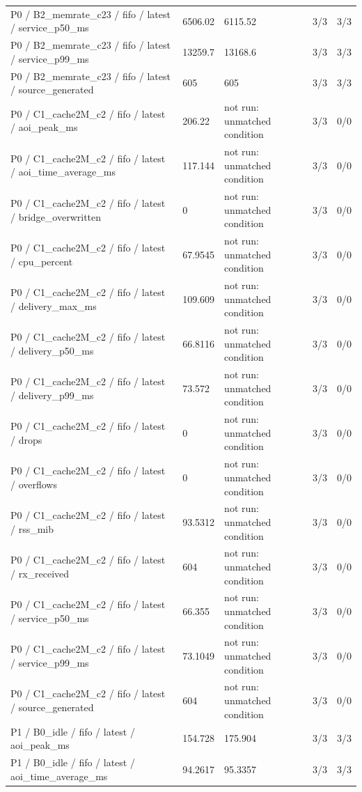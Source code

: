\begin{tabular}{@{}lllll@{}}
P0 / B2\_memrate\_c23 / fifo / latest / service\_p50\_ms & 6506.02 & 6115.52 & 3/3 & 3/3 \\
P0 / B2\_memrate\_c23 / fifo / latest / service\_p99\_ms & 13259.7 & 13168.6 & 3/3 & 3/3 \\
P0 / B2\_memrate\_c23 / fifo / latest / source\_generated & 605 & 605 & 3/3 & 3/3 \\
P0 / C1\_cache2M\_c2 / fifo / latest / aoi\_peak\_ms & 206.22 & not run: unmatched condition & 3/3 & 0/0 \\
P0 / C1\_cache2M\_c2 / fifo / latest / aoi\_time\_average\_ms & 117.144 & not run: unmatched condition & 3/3 & 0/0 \\
P0 / C1\_cache2M\_c2 / fifo / latest / bridge\_overwritten & 0 & not run: unmatched condition & 3/3 & 0/0 \\
P0 / C1\_cache2M\_c2 / fifo / latest / cpu\_percent & 67.9545 & not run: unmatched condition & 3/3 & 0/0 \\
P0 / C1\_cache2M\_c2 / fifo / latest / delivery\_max\_ms & 109.609 & not run: unmatched condition & 3/3 & 0/0 \\
P0 / C1\_cache2M\_c2 / fifo / latest / delivery\_p50\_ms & 66.8116 & not run: unmatched condition & 3/3 & 0/0 \\
P0 / C1\_cache2M\_c2 / fifo / latest / delivery\_p99\_ms & 73.572 & not run: unmatched condition & 3/3 & 0/0 \\
P0 / C1\_cache2M\_c2 / fifo / latest / drops & 0 & not run: unmatched condition & 3/3 & 0/0 \\
P0 / C1\_cache2M\_c2 / fifo / latest / overflows & 0 & not run: unmatched condition & 3/3 & 0/0 \\
P0 / C1\_cache2M\_c2 / fifo / latest / rss\_mib & 93.5312 & not run: unmatched condition & 3/3 & 0/0 \\
P0 / C1\_cache2M\_c2 / fifo / latest / rx\_received & 604 & not run: unmatched condition & 3/3 & 0/0 \\
P0 / C1\_cache2M\_c2 / fifo / latest / service\_p50\_ms & 66.355 & not run: unmatched condition & 3/3 & 0/0 \\
P0 / C1\_cache2M\_c2 / fifo / latest / service\_p99\_ms & 73.1049 & not run: unmatched condition & 3/3 & 0/0 \\
P0 / C1\_cache2M\_c2 / fifo / latest / source\_generated & 604 & not run: unmatched condition & 3/3 & 0/0 \\
P1 / B0\_idle / fifo / latest / aoi\_peak\_ms & 154.728 & 175.904 & 3/3 & 3/3 \\
P1 / B0\_idle / fifo / latest / aoi\_time\_average\_ms & 94.2617 & 95.3357 & 3/3 & 3/3 \\

\end{tabular}
